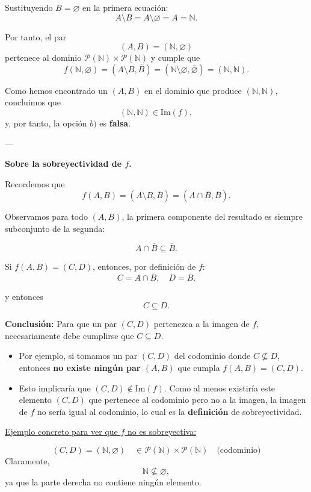 \documentclass[a4paper,12pt]{article}
\begin{document}
\begin{ejercicioExamen}[title=Ejercicio 1]

Sustituyendo \(B = \varnothing\) en la primera ecuación:
\[
A \setminus B = A \setminus \varnothing = A = \mathbb{N}.
\]

\medskip
Por tanto, el par
\[
(A,B) = (\mathbb{N}, \varnothing)
\]
pertenece al dominio \(\mathcal{P}(\mathbb{N}) \times \mathcal{P}(\mathbb{N})\) y cumple que
\[
f(\mathbb{N}, \varnothing) = (A \setminus B, \overline{B}) = (\mathbb{N} \setminus \varnothing, \overline{\varnothing}) = (\mathbb{N}, \mathbb{N}).
\]

\medskip
Como hemos encontrado un \((A,B)\) en el dominio que produce \((\mathbb{N}, \mathbb{N})\), concluimos que
\[
(\mathbb{N}, \mathbb{N}) \in \mathrm{Im}(f),
\]
y, por tanto, la opción $b)$ es \textbf{falsa}.

---

\textbf{Sobre la sobreyectividad de \(f\).}  

Recordemos que
\[
f(A,B) = (A \setminus B, \overline{B}) = (A \cap \overline{B}, \overline{B}).
\]

Observamos para todo $(A,B)$, la primera componente del resultado es siempre subconjunto de la segunda:

\[
A \cap \overline{B} \subseteq \overline{B}.
\]

Si \(f(A,B) = (C,D)\), entonces, por definición de \(f\):
\[
C = A \cap \overline{B}, \quad D = \overline{B}.
\]

y entonces
\[
C \subseteq D.
\]

\medskip
\textbf{Conclusión:} Para que un par \((C,D)\) pertenezca a la imagen de \(f\), necesariamente debe cumplirse que \(C \subseteq D\).  

\begin{itemize}
    \item Por ejemplo, si tomamos un par \((C,D)\) del codominio donde \(C \not\subseteq D\), entonces \textbf{no existe ningún par \((A,B)\)} que cumpla \(f(A,B) = (C,D)\).  
    \item Esto implicaría que \((C,D) \notin \mathrm{Im}(f)\). Como al menos existiría este elemento $(C,D)$ que pertenece al codominio pero no a la imagen, la imagen de $f$ no sería igual al codominio, lo cual es la \textbf{definición} de sobreyectividad.
\end{itemize}

\underline{Ejemplo concreto para ver que \(f\) no es sobreyectiva:}

\[
(C,D) = (\mathbb{N}, \varnothing) \quad \in \mathcal{P}(\mathbb{N}) \times \mathcal{P}(\mathbb{N}) \quad \text{(codominio)}
\]
Claramente,
\[
\mathbb{N} \not\subseteq \varnothing,
\]
ya que la parte derecha no contiene ningún elemento.

\end{ejercicioExamen}
\end{document}
